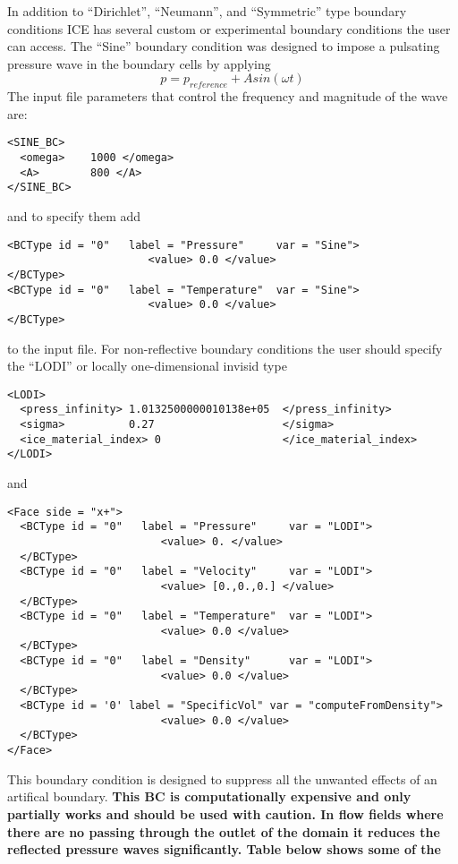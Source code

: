 %
In addition to ``Dirichlet'', ``Neumann'', and ``Symmetric'' type boundary
conditions ICE has several custom or experimental  boundary conditions the user can
access.  The ``Sine'' boundary condition was designed to impose a pulsating
pressure wave in the boundary cells by applying
%
\begin{equation} \label{eq:pSine}
  p = p_{reference} + A  sin(\omega t)
\end{equation}
%
The input file parameters that control the frequency and magnitude of the  wave are: 
\begin{Verbatim}[fontsize=\footnotesize]
<SINE_BC>
  <omega>    1000 </omega>
  <A>        800 </A>
</SINE_BC>
\end{Verbatim}
and to specify them add
\begin{Verbatim}[fontsize=\footnotesize]
<BCType id = "0"   label = "Pressure"     var = "Sine"> 
                      <value> 0.0 </value> 
</BCType> 
<BCType id = "0"   label = "Temperature"  var = "Sine"> 
                      <value> 0.0 </value>
</BCType>
\end{Verbatim}
%
to the input file.
%
For non-reflective boundary conditions the user should specify the ``LODI''
or locally one-dimensional invisid type \cite{ref:Sutherland}

\begin{Verbatim}[fontsize=\footnotesize]
<LODI>
  <press_infinity> 1.0132500000010138e+05  </press_infinity>
  <sigma>          0.27                    </sigma>
  <ice_material_index> 0                   </ice_material_index>
</LODI>
\end{Verbatim}
%
and
%
\begin{Verbatim}[fontsize=\footnotesize]
<Face side = "x+">
  <BCType id = "0"   label = "Pressure"     var = "LODI">
                        <value> 0. </value>                
  </BCType>
  <BCType id = "0"   label = "Velocity"     var = "LODI">
                        <value> [0.,0.,0.] </value>
  </BCType>
  <BCType id = "0"   label = "Temperature"  var = "LODI">
                        <value> 0.0 </value>
  </BCType>
  <BCType id = "0"   label = "Density"      var = "LODI">
                        <value> 0.0 </value>
  </BCType>
  <BCType id = '0' label = "SpecificVol" var = "computeFromDensity">
                        <value> 0.0 </value>
  </BCType>
</Face> 
\end{Verbatim}
%
This boundary condition is designed to suppress all the unwanted effects of an
artifical boundary. \bf This BC is computationally expensive and only partially
works and should be used with caution\normalfont.  In flow fields where
there are no passing through the outlet of the domain it reduces
the reflected pressure waves significantly.
%
Table below shows some of the

